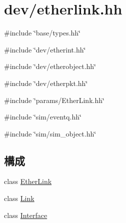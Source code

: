 \hypertarget{etherlink_8hh}{
\section{dev/etherlink.hh}
\label{etherlink_8hh}
}
{\ttfamily \#include \char`\"{}base/types.hh\char`\"{}}\par
{\ttfamily \#include \char`\"{}dev/etherint.hh\char`\"{}}\par
{\ttfamily \#include \char`\"{}dev/etherobject.hh\char`\"{}}\par
{\ttfamily \#include \char`\"{}dev/etherpkt.hh\char`\"{}}\par
{\ttfamily \#include \char`\"{}params/EtherLink.hh\char`\"{}}\par
{\ttfamily \#include \char`\"{}sim/eventq.hh\char`\"{}}\par
{\ttfamily \#include \char`\"{}sim/sim\_\-object.hh\char`\"{}}\par
\subsection*{構成}
\begin{DoxyCompactItemize}
\item 
class \hyperlink{classEtherLink}{EtherLink}
\item 
class \hyperlink{classEtherLink_1_1Link}{Link}
\item 
class \hyperlink{classEtherLink_1_1Interface}{Interface}
\end{DoxyCompactItemize}
